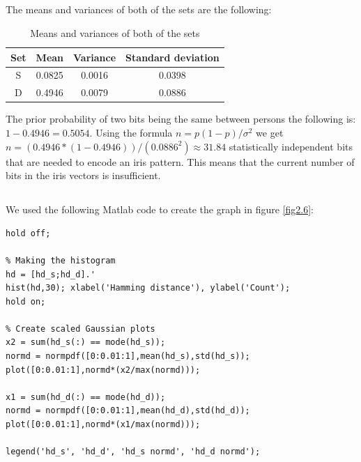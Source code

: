 \documentclass{article}
\begin{document}
\subsection{}
The means and variances of both of the sets are the following:
\begin{table}[H]
 \begin{tabular}{|c|c|c|c|}
  \hline
  Set & Mean & Variance & Standard deviation \\
  \hline
  S & 0.0825 & 0.0016 & 0.0398 \\
  \hline
  D & 0.4946 & 0.0079 & 0.0886 \\
  \hline
 \end{tabular}
 \caption{Means and variances of both of the sets}
 \label{tab2.5}
\end{table}
\noindent The prior probability of two bits being the same between persons the following is: $1-0.4946=0.5054$.
Using the formula $n=p(1-p)/\sigma^2$ we get $n=(0.4946*(1-0.4946))/(0.0886^2)\approx 31.84$ statistically independent bits that are needed to encode an iris pattern. This means that the current number of bits in the iris vectors is insufficient.

\subsection{}
We used the following Matlab code to create the graph in figure \ref{fig2.6}:
\begin{lstlisting}
hold off;

% Making the histogram
hd = [hd_s;hd_d].'
hist(hd,30); xlabel('Hamming distance'), ylabel('Count');
hold on;

% Create scaled Gaussian plots
x2 = sum(hd_s(:) == mode(hd_s));
normd = normpdf([0:0.01:1],mean(hd_s),std(hd_s));
plot([0:0.01:1],normd*(x2/max(normd)));

x1 = sum(hd_d(:) == mode(hd_d));
normd = normpdf([0:0.01:1],mean(hd_d),std(hd_d));
plot([0:0.01:1],normd*(x1/max(normd)));

legend('hd_s', 'hd_d', 'hd_s normd', 'hd_d normd');
\end{lstlisting}
\end{document}
